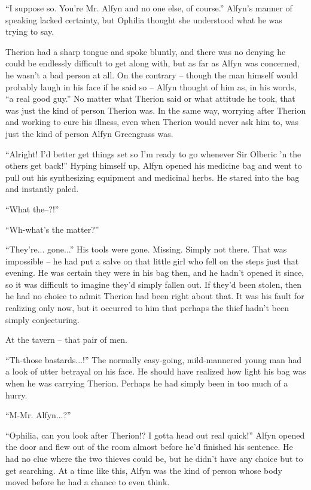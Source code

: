 ``I suppose so. You're Mr. Alfyn and no one else, of course.'' Alfyn's manner of speaking lacked certainty, but Ophilia thought she understood what he was trying to say. 

Therion had a sharp tongue and spoke bluntly, and there was no denying he could be endlessly difficult to get along with, but as far as Alfyn was concerned, he wasn't a bad person at all. On the contrary -- though the man himself would probably laugh in his face if he said so -- Alfyn thought of him as, in his words, ``a real good guy.'' No matter what Therion said or what attitude he took, that was just the kind of person Therion was. In the same way, worrying after Therion and working to cure his illness, even when Therion would never ask him to, was just the kind of person Alfyn Greengrass was.

``Alright! I'd better get things set so I'm ready to go whenever Sir Olberic 'n the others get back!'' Hyping himself up, Alfyn opened his medicine bag and went to pull out his synthesizing equipment and medicinal herbs. He stared into the bag and instantly paled.

``What the--?!''

``Wh-what's the matter?''

``They're... gone...'' His tools were gone. Missing. Simply not there. That was impossible -- he had put a salve on that little girl who fell on the steps just that evening. He was certain they were in his bag then, and he hadn't opened it since, so it was difficult to imagine they'd simply fallen out. If they'd been stolen, then he had no choice to admit Therion had been right about that. It was his fault for realizing only now, but it occurred to him that perhaps the thief hadn't been simply conjecturing.

At the tavern -- that pair of men.

``Th-those bastards...!'' The normally easy-going, mild-mannered young man had a look of utter betrayal on his face. He should have realized how light his bag was when he was carrying Therion. Perhaps he had simply been in too much of a hurry.

``M-Mr. Alfyn...?''

``Ophilia, can you look after Therion!? I gotta head out real quick!'' Alfyn opened the door and flew out of the room almost before he'd finished his sentence. He had no clue where the two thieves could be, but he didn't have any choice but to get searching. At a time like this, Alfyn was the kind of person whose body moved before he had a chance to even think.

